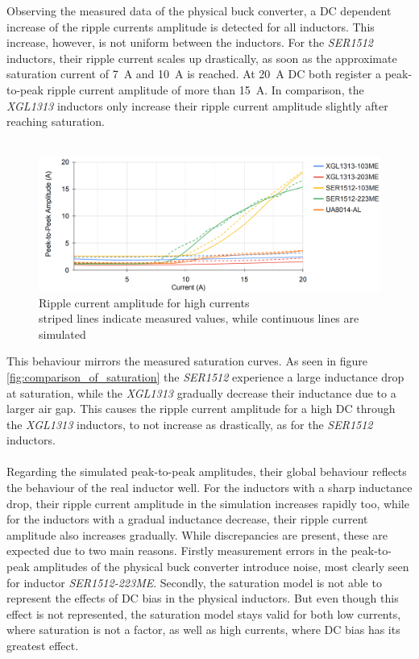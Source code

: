Observing the measured data of the physical buck converter, a \ac{DC} dependent increase of the ripple currents amplitude is detected for all inductors. This increase, however, is not uniform between the inductors. For the \textit{SER1512} inductors, their ripple current scales up drastically, as soon as the approximate saturation current of \SI{7}{\A} and \SI{10}{\A} is reached. At \SI{20}{\A} \ac{DC} both register a peak-to-peak ripple current amplitude of more than \SI{15}{\A}. In comparison, the \textit{XGL1313} inductors only increase their ripple current amplitude slightly after reaching saturation.\\\\
\begin{figure}[h]
    \centering
    \includegraphics[width=1\linewidth]{Bilder//Kapitel4/High Current_2.png}
    \caption{Ripple current amplitude for high currents \\striped lines indicate measured values, while continuous lines are simulated}
    \label{fig:ripple_current_amplitude_for_high_currents}
\end{figure}
This behaviour mirrors the measured saturation curves. As seen in figure \ref{fig:comparison_of_saturation} the \textit{SER1512} experience a large inductance drop at saturation, while the \textit{XGL1313} gradually decrease their inductance due to a larger air gap. This causes the ripple current amplitude for a high \ac{DC} through the \textit{XGL1313} inductors, to not increase as drastically, as for the \textit{SER1512} inductors.\\\\
Regarding the simulated peak-to-peak amplitudes, their global behaviour reflects the behaviour of the real inductor well. For the inductors with a sharp inductance drop, their ripple current amplitude in the simulation increases rapidly too, while for the inductors with a gradual inductance decrease, their ripple current amplitude also increases gradually. While discrepancies are present, these are expected due to two main reasons. Firstly measurement errors in the peak-to-peak amplitudes of the physical buck converter introduce noise, most clearly seen for inductor \textit{SER1512-223ME}. Secondly, the saturation model is not able to represent the effects of \ac{DC} bias in the physical inductors. But even though this effect is not represented, the saturation model stays valid for both low currents, where saturation is not a factor, as well as high currents, where \ac{DC} bias has its greatest effect. \\

